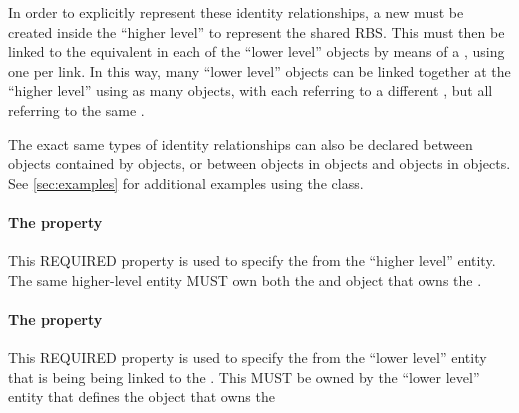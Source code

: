 In order to explicitly represent these identity relationships, a new  must be created inside the ``higher level''  to represent the shared RBS.  
This  must then be linked to the equivalent  in each of the ``lower level''  objects by means of a , using one  per link. In this way, many ``lower level''  objects can be linked together at the ``higher level'' using as many  objects, with each  referring to a different  , but all referring to the same  .


The exact same types of identity relationships can also be declared between  objects contained by  objects, or between  objects in  objects and  objects in  objects. See \ref{sec:examples} for additional examples using the  class.

\paragraph{The  property}\label{sec:local}
This REQUIRED property is used to specify the  from the ``higher level'' entity.  The same higher-level entity MUST own both the  and object that owns the .

\paragraph{The  property}\label{sec:remote}
This REQUIRED property is used to specify the  from the ``lower level'' entity that is being being linked to the  .  This  MUST be owned by the ``lower level'' entity that defines the object that owns the 

